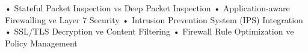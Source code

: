 • Stateful Packet Inspection vs Deep Packet Inspection
• Application-aware Firewalling ve Layer 7 Security
• Intrusion Prevention System (IPS) Integration
• SSL/TLS Decryption ve Content Filtering
• Firewall Rule Optimization ve Policy Management